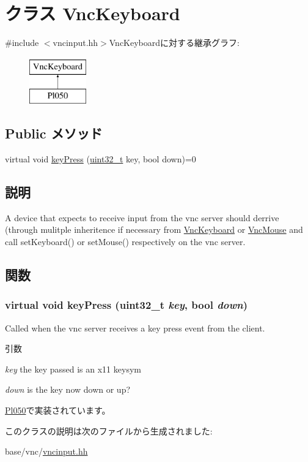 \hypertarget{classVncKeyboard}{
\section{クラス VncKeyboard}
\label{classVncKeyboard}
}


{\ttfamily \#include $<$vncinput.hh$>$}VncKeyboardに対する継承グラフ:\begin{figure}[H]
\begin{center}
\leavevmode
\includegraphics[height=2cm]{classVncKeyboard}
\end{center}
\end{figure}
\subsection*{Public メソッド}
\begin{DoxyCompactItemize}
\item 
virtual void \hyperlink{classVncKeyboard_a5159bd9abc87d9ed9e74c782173e8f0f}{keyPress} (\hyperlink{Type_8hh_a435d1572bf3f880d55459d9805097f62}{uint32\_\-t} key, bool down)=0
\end{DoxyCompactItemize}


\subsection{説明}
A device that expects to receive input from the vnc server should derrive (through mulitple inheritence if necessary from \hyperlink{classVncKeyboard}{VncKeyboard} or \hyperlink{classVncMouse}{VncMouse} and call setKeyboard() or setMouse() respectively on the vnc server. 

\subsection{関数}
\hypertarget{classVncKeyboard_a5159bd9abc87d9ed9e74c782173e8f0f}{
\subsubsection[{keyPress}]{\setlength{\rightskip}{0pt plus 5cm}virtual void keyPress ({\bf uint32\_\-t} {\em key}, \/  bool {\em down})}}
\label{classVncKeyboard_a5159bd9abc87d9ed9e74c782173e8f0f}
Called when the vnc server receives a key press event from the client. 
\begin{DoxyParams}{引数}
\item[{\em key}]the key passed is an x11 keysym \item[{\em down}]is the key now down or up? \end{DoxyParams}


\hyperlink{classPl050_a24207a2cfb1351040a29bc3a1e341e42}{Pl050}で実装されています。

このクラスの説明は次のファイルから生成されました:\begin{DoxyCompactItemize}
\item 
base/vnc/\hyperlink{vncinput_8hh}{vncinput.hh}\end{DoxyCompactItemize}
